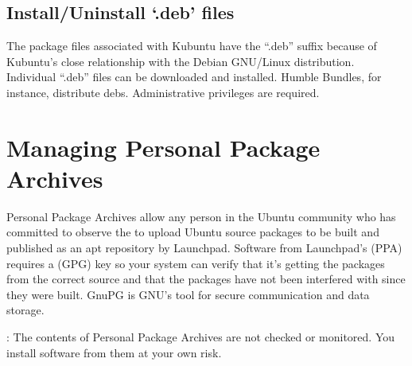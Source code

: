 \documentclass[letterpaper,10pt,english]{sphinxmanual}
\begin{document}
\subsection{Install/Uninstall ‘.deb’ files}
\label{\detokenize{docs/repositories:install-uninstall-deb-files}}
\sphinxAtStartPar
The package files associated with Kubuntu have the “.deb” suffix because of Kubuntu’s close relationship with the Debian GNU/Linux distribution. Individual “.deb” files can be downloaded and installed. Humble Bundles, for instance, distribute debs. Administrative privileges are required.


\section{Managing Personal Package Archives}
\label{\detokenize{docs/repositories:managing-personal-package-archives}}
\sphinxAtStartPar
Personal Package Archives allow any person in the Ubuntu community who has committed to observe the  to upload Ubuntu source packages to be built and published as an apt repository by Launchpad. Software from Launchpad’s  (PPA) requires a  (GPG) key so your system can verify that it’s getting the packages from the correct source and that the packages have not been interfered with since they were built. GnuPG is GNU’s tool for secure communication and data storage.

\sphinxAtStartPar
{}: The contents of Personal Package Archives are not checked or monitored. You install software from them at your own risk.
\end{document}
